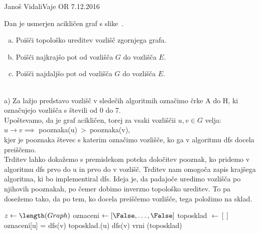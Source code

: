 \begin{naloga}{Janoš Vidali}{Vaje OR 7.12.2016}
\begin{vprasanje}
Dan je usmerjen acikličen graf s slike~\fig.

\begin{enumerate}[(a)]
\item Poišči topološko ureditev vozlišč zgornjega grafa.

\item Poišči najkrajšo pot od vozlišča $G$ do vozlišča $E$.

\item Poišči najdaljšo pot od vozlišča $G$ do vozlišča $E$.
\end{enumerate}

\begin{slika}
\pgfslika
{}
\end{slika}
\end{vprasanje}
\begin{odgovor}\\

\noindent a) Za lažjo predstavo vozlišč v sledečih algoritmih
označimo črke A do H, ki označujejo vozlišča s števili od 0 do 7.\\

\noindent Upoštevamo, da je graf acikličen, torej za vsaki vozliščii $u, v \in G$ velja: \\[5px]
$u \rightarrow v \implies $ pooznaka(u)\ \textgreater \ pooznaka(v), \\[5px]
kjer je pooznaka števec s katerim označimo vozlišče, ko ga v algoritmu dfs docela preiščemo.\\

\noindent Trditev lahko dokažemo s premislekom poteka določitev pooznak,
ko pridemo v algoritmu dfs prvo do u in prvo do v vozlišč.
Trditev nam omogoča zapis krajšega algoritma, ki bo implementiral dfs.
Ideja je, da padajoče uredimo vozlišča po njihovih pooznakah,
po čemer dobimo inverzno topološko ureditev.
To pa dosežemo tako, da po tem, ko docela preiščemo vozlišče, tega položimo na sklad. \\

\begin{algorithmic}
	\State $z \gets \length(Graph)$
	\State oznaceni $\gets [\False, \dots, \False]$
	\State toposklad $\gets []$
		\State oznaceni[u] = \True
				\State dfs(v)
			\EndIf
		\EndFor
		\State toposklad.\append(u)
	\EndFunction
			\State dfs(v)
		\EndIf
	\EndFor
	\State vrni \reverse(toposklad)
\EndFunction \\
\end{algorithmic}


\end{odgovor}
\end{naloga}
